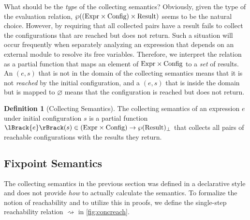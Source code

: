 \documentclass[acmsmall,screen,review]{acmart}
\theoremstyle{definition}
\newtheorem{definition}{Definition}[section]
\newcommand*{\Expr}{\text{Expr}}
\newcommand*{\Time}{\mathbb{T}}
\newcommand*{\Config}[1]{\text{Config}\vphantom{#1}}
\newcommand*{\Result}[1]{\text{Result}\vphantom{#1}}
\newcommand*{\sembracket}[1]{\lBrack{#1}\rBrack}
\begin{document}
What should be the \emph{type} of the collecting semantics?
Obviously, given the type of the evaluation relation, $\wp((\Expr\times\Config{\Time})\times\Result{\Time})$ seems to be the natural choice.
However, by requiring that all collected pairs have a result fails to collect the configurations that are reached but does not return.
Such a situation will occur frequently when separately analyzing an expression that depends on an external module to resolve its free variables.
Therefore, we interpret the relation as a partial function that maps an element of $\Expr\times\Config\Time$ to a \emph{set} of results.
An $(e,s)$ that is not in the domain of the collecting semantics means that it is not \emph{reached} by the initial configuration, and a $(e,s)$ that is inside the domain but is mapped to $\varnothing$ means that the configuration is reached but does not return.

\begin{definition}[Collecting Semantics]
  The collecting semantics of an expression $e$ under initial configuration $s$ is a partial function $\sembracket{e}(s)\in(\Expr\times\Config\Time)\rightarrow\wp(\Result{\Time})_\bot$ that collects all pairs of reachable configurations with the results they return.
\end{definition}

\subsection{Fixpoint Semantics}

The collecting semantics in the previous section was defined in a declarative style and does not provide \emph{how} to actually calculate the semantics.
To formalize the notion of reachability and to utilize this in proofs, we define the single-step reachability relation $\rightsquigarrow$ in \ref{fig:concreach}.
\end{document}
